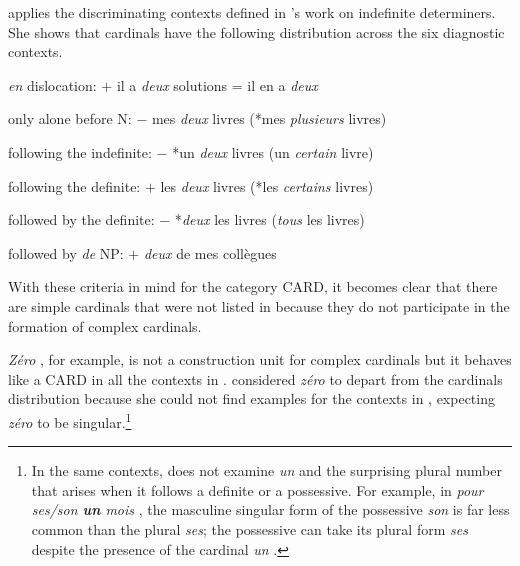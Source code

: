 \documentclass[output=paper]{langsci/langscibook}
\begin{document}
\cite[31--40]{Saulnier10} applies the discriminating contexts defined in \cite{Leeman04}'s work on  indefinite determiners. She shows that cardinals  have the following distribution across the six diagnostic contexts.
\ea\label{cardCriteria}
\begin{description}
    \item \emph{en} dislocation: $+$ \fldr{} il a \emph{deux} solutions = il en a \emph{deux} 		\\\hfill{}
    \item only alone before N: $-$  \fldr{} mes \emph{deux} livres (*mes \emph{plusieurs} livres) 	\\\hfill{}
    \item following the indefinite: $-$ \fldr{} *un \emph{deux} livres (un \emph{certain} livre)		\\\hfill{}
    \item following the definite: $+$ \fldr{} les \emph{deux} livres (*les \emph{certains} livres)		\\\hfill{}
    \item followed by the definite: $-$ \fldr{} *\emph{deux} les livres (\emph{tous} les livres)		\\\hfill{}
    \item followed by \emph{de} NP: $+$ \fldr{} \emph{deux} de mes collègues				\\\hfill{}
\end{description}
\z

With these criteria in mind for the category CARD, it becomes clear that there are simple cardinals  that were not listed in  because they do not participate in the formation of complex cardinals.

\emph{Zéro} , for example, is not a construction unit for complex cardinals  but it behaves like a CARD in all the contexts in . \cite[38]{Saulnier10} considered \emph{zéro} to depart from the cardinals  distribution because she could not find examples for the contexts in , expecting \emph{zéro} to be singular.\footnote{In the same contexts, \citeauthor{Saulnier10} does not examine \emph{un} and the surprising plural number that arises when it follows a definite or a possessive. For example, in \emph{pour ses/son \textbf{un} mois} , the masculine singular form of the possessive \emph{son} is far less common than the plural \emph{ses}; the possessive can take its plural form \emph{ses} despite the presence of the cardinal \emph{un} .}
\end{document}
